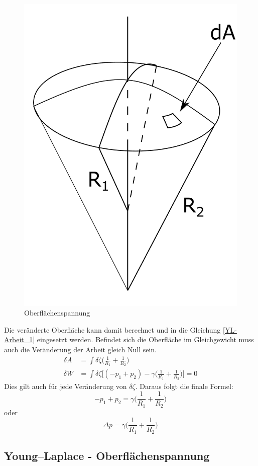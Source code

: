 \begin{refsection}
\begin{figure}[H]
  \includegraphics[scale=0.2]{minimal/Young.pdf}
  \caption{Oberflächenspannung} 
\end{figure}
Die veränderte Oberfläche kann damit berechnet und in die Gleichung \ref{YL-Arbeit_1} eingesetzt werden. Befindet sich die Oberfläche im Gleichgewicht muss auch die Veränderung der Arbeit gleich Null sein.
\begin{equation}
\begin{split}
\delta A &= \int \delta\zeta \bigg( \frac{1}{R_1}+\frac{1}{R_2} \bigg) \\
\delta W &= \int \delta\zeta \bigg[ (-p_1+p_2)-\gamma \bigg( \frac{1}{R_1}+\frac{1}{R_2} \bigg) \bigg] =0
\end{split}
\end{equation}
Dies gilt auch für jede Veränderung von $\delta\zeta$. Daraus folgt die finale Formel:
\begin{equation}
-p_1+p_2 = \gamma\bigg( \frac{1}{R_1}+\frac{1}{R_2} \bigg)
\end{equation}
oder
\begin{equation}\label{Young-Laplace}
\Delta p = \gamma\bigg( \frac{1}{R_1}+\frac{1}{R_2} \bigg)
\end{equation}




\subsection{Young–Laplace - Oberflächenspannung}
\printbibliography[heading=subbibliography]
\end{refsection}